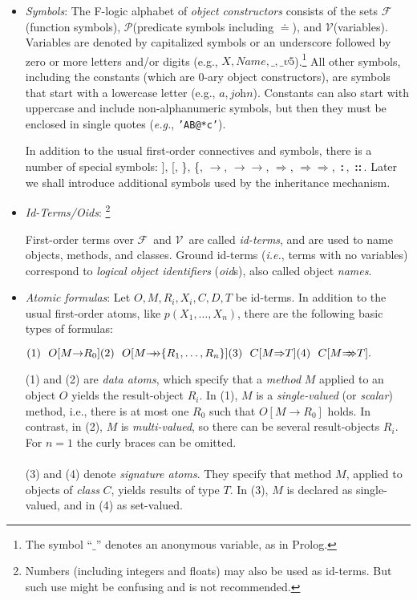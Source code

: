 \documentclass[11pt]{article}
\newcommand{\isa}{\,{\bf{:}}\,}
\newcommand{\subcl}{\,{\bf{::}}\,}
\newcommand{\eq}{\ensuremath{\doteq}}                           %
\newcommand{\fd}{\ensuremath{{\rightarrow}}}                   %
\newcommand{\mvd}{\ensuremath{{\rightarrow\!\!\!\!\rightarrow}}}  %
\newcommand{\Fd}{\ensuremath{{\Rightarrow}}}                      %
\newcommand{\Mvd}{\ensuremath{{\Rightarrow\!\!\!\!\Rightarrow}}}  %
\newcommand{\fl}{{F-logic}\xspace}
\newcommand{\funcs}{\ensuremath{\mathcal{F}}}
\newcommand{\preds}{\ensuremath{\mathcal{P}}}
\newcommand{\vars}{\ensuremath{\mathcal{V}}}
\begin{document}
\begin{itemize}
\item \emph{Symbols}: The \fl alphabet of \emph{object constructors}
  consists of the sets \funcs (function symbols), \preds (predicate symbols
  including $\eq$), and \vars (variables).  Variables are denoted by
  capitalized symbols or an underscore followed by zero or more letters
  and/or digits (e.g., $X,\textit{Name}, \_, \_v5$).\footnote{
    The symbol ``$\_$'' denotes an anonymous variable, as in Prolog.
    }
  All other symbols, including the constants (which are 0-ary object
  constructors), are symbols that start with a lowercase letter (e.g., $a,
  \textit{john}$). Constants can also start with uppercase and include
  non-alphanumeric symbols, but then they must be enclosed in single
  quotes ({\it e.g.}, {\tt 'AB@*c'}). 
  
  In addition to the usual first-order connectives and symbols,
  there is a number of special symbols: ], [, \}, \{, \fd, \mvd, \Fd,
  \Mvd,
  \isa, \subcl. Later we shall introduce additional symbols used by the
  inheritance mechanism.
\item \emph{Id-Terms/Oids}: \footnote{
    Numbers (including integers and floats) may also be used as id-terms. But
    such use might be confusing and is not recommended.
    }
\medskip
  
    First-order terms over \funcs\ and \vars\ are called \emph{id-terms},
    and are used to name objects, methods, and classes.  Ground id-terms
    ({\it i.e.}, terms with no variables) correspond to \emph{logical
      object identifiers} (\emph{oid}s), also called object \emph{names}.
\item \emph{Atomic formulas}: Let $O,M,R_{i},X_{i},C,D,T$ be id-terms.  In
  addition to the usual first-order atoms, like $p(X_1,\dots,X_n)$, there
  are the following basic types of formulas: \medskip

  \begin{math}
    \hfill (1)~~O[M\fd R_0] \hfill (2)~~O[M\mvd \{R_1,\dots,R_n\}]
    \hfill (3)~~C[M\Fd T] \hfill (4)~~C[M\Mvd T]. \hfill
  \end{math} \medskip
  
  (1) and (2) are \emph{data atoms}, which specify that a \emph{method} $M$
  applied to an object $O$ yields the result-object $R_i$. In (1), $M$ is a
  \emph{single-valued} (or \emph{scalar}) method, i.e., there is
  at most one $R_0$ such that $O[M\fd R_0]$ holds. In contrast, in
  (2), $M$ is \emph{multi-valued}, so there can be several result-objects
  $R_i$. For $n=1$ the curly braces can be omitted.\\ 
  \\
  (3) and (4) denote \emph{signature atoms}. They specify that method $M$,
  applied to objects of \emph{class} $C$, yields results of type $T$.
  In (3), $M$ is declared as single-valued, and in (4) as set-valued.
  

\end{itemize}
\end{document}
